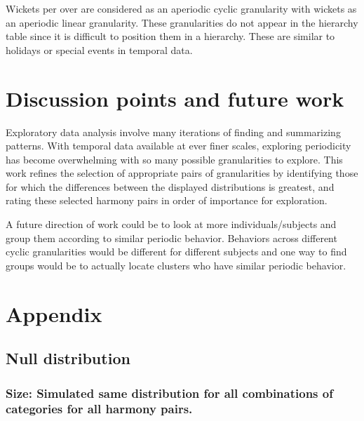 \documentclass[
]{article}
\begin{document}
Wickets per over are considered as an aperiodic cyclic granularity with wickets as an aperiodic linear granularity. These granularities do not appear in the hierarchy table since it is difficult to position them in a hierarchy. These are similar to holidays or special events in temporal data.

\hypertarget{discussion-points-and-future-work}{%
\section{Discussion points and future work}\label{discussion-points-and-future-work}}

Exploratory data analysis involve many iterations of finding and summarizing patterns. With temporal data available at ever finer scales, exploring periodicity has become overwhelming with so many possible granularities to explore. This work refines the selection of appropriate pairs of granularities by identifying those for which the differences between the displayed distributions is greatest, and rating these selected harmony pairs in order of importance for exploration.

A future direction of work could be to look at more individuals/subjects and group them according to similar periodic behavior. Behaviors across different cyclic granularities would be different for different subjects and one way to find groups would be to actually locate clusters who have similar periodic behavior.

\hypertarget{appendix}{%
\section{Appendix}\label{appendix}}

\hypertarget{null-distribution-1}{%
\subsection{Null distribution}\label{null-distribution-1}}

\hypertarget{size-simulated-same-distribution-for-all-combinations-of-categories-for-all-harmony-pairs.}{%
\subsubsection{Size: Simulated same distribution for all combinations of categories for all harmony pairs.}\label{size-simulated-same-distribution-for-all-combinations-of-categories-for-all-harmony-pairs.}}
\end{document}
